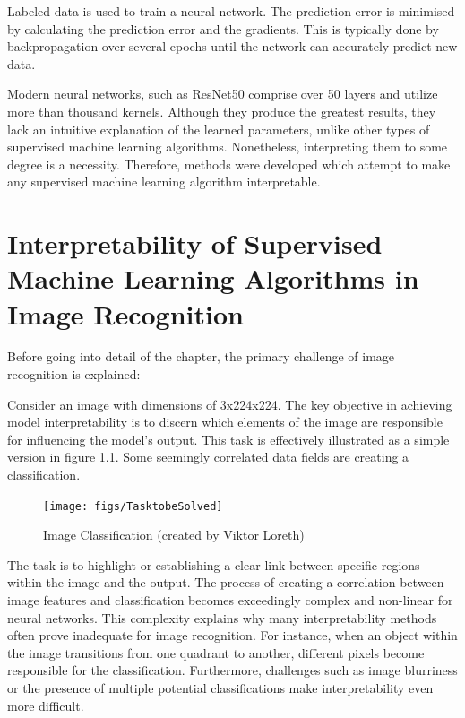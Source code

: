 Labeled data is used to train a neural network. The prediction error is minimised by calculating the prediction error and the gradients. This is typically done by backpropagation over several epochs until the network can accurately predict new data.

Modern neural networks, such as ResNet50 \cite{he2015deep} comprise over 50 layers and utilize more than thousand kernels. Although they produce the greatest results, they lack an intuitive explanation of the learned parameters, unlike other types of supervised machine learning algorithms. Nonetheless, interpreting them to some degree is a necessity. Therefore, methods were developed which attempt to make any supervised machine learning algorithm interpretable. 

\chapter{Interpretability of Supervised Machine Learning Algorithms in Image Recognition}
\label{sec:IoNN}

Before going into detail of the chapter, the primary challenge of image recognition is explained:

Consider an image with dimensions of 3x224x224. The key objective in achieving model interpretability is to discern which elements of the image are responsible for influencing the model's output. This task is effectively illustrated as a simple version in figure \ref{fig:Task}. Some seemingly correlated data fields are creating a classification.

\begin{figure}[h!]
	\centering
	\texttt{[image: figs/TasktobeSolved]}
	\caption[Image Classification]{Image Classification (created by Viktor Loreth)}
	\label{fig:Task}
\end{figure}

The task is to highlight or establishing a clear link between specific regions within the image and the output. The process of creating a correlation between image features and classification becomes exceedingly complex and non-linear for neural networks. This complexity explains why many interpretability methods often prove inadequate for image recognition. For instance, when an object within the image transitions from one quadrant to another, different pixels become responsible for the classification. Furthermore, challenges such as image blurriness or the presence of multiple potential classifications make interpretability even more difficult.

